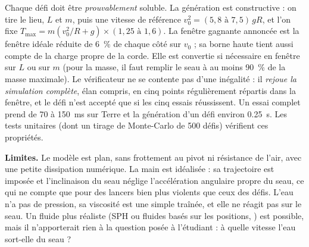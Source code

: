 Chaque défi doit être \emph{prouvablement} soluble. La génération est
constructive : on tire le lieu, \(L\) et \(m\), puis une vitesse de référence
\(v_0^2 = (5{,}8 \text{ à } 7{,}5) \, g R\), et l'on fixe
\(T_{\max} = m (v_0^2/R + g) \times (1{,}25 \text{ à } 1{,}6)\). La fenêtre gagnante
annoncée est la fenêtre idéale réduite de \SI{6}{\percent} de chaque côté sur \(v_0\) ;
sa borne haute tient aussi compte de la charge propre de la corde. Elle est
convertie si nécessaire en fenêtre sur \(L\) ou sur \(m\) (pour la masse, il faut
remplir le seau à au moins \SI{90}{\percent} de la masse maximale). Le vérificateur
 ne se contente pas d'une inégalité : il \emph{rejoue
la simulation complète}, élan compris, en cinq points régulièrement répartis dans
la fenêtre, et le défi n'est accepté que si les cinq essais réussissent. Un essai
complet prend de 70 à \SI{150}{ms} sur Terre et la génération d'un défi environ
\SI{0,25}{s}. Les tests unitaires (dont un tirage de Monte-Carlo de 500 défis)
vérifient ces propriétés.

\begin{pointcle}
\textbf{Limites.} Le modèle est plan, sans frottement au pivot ni résistance de
l'air, avec une petite dissipation numérique. La main est idéalisée : sa
trajectoire est imposée et l'inclinaison du seau néglige l'accélération angulaire
propre du seau, ce qui ne compte que pour des lancers bien plus violents que ceux
des défis. L'eau n'a pas de pression, sa viscosité est une simple traînée, et
elle ne réagit pas sur le seau. Un fluide
plus réaliste (SPH ou fluides basés sur les positions,
\cite{monaghan1992sph, macklin2013pbf}) est possible, mais il n'apporterait rien à
la question posée à l'étudiant : à quelle vitesse l'eau sort-elle du seau ?
\end{pointcle}
